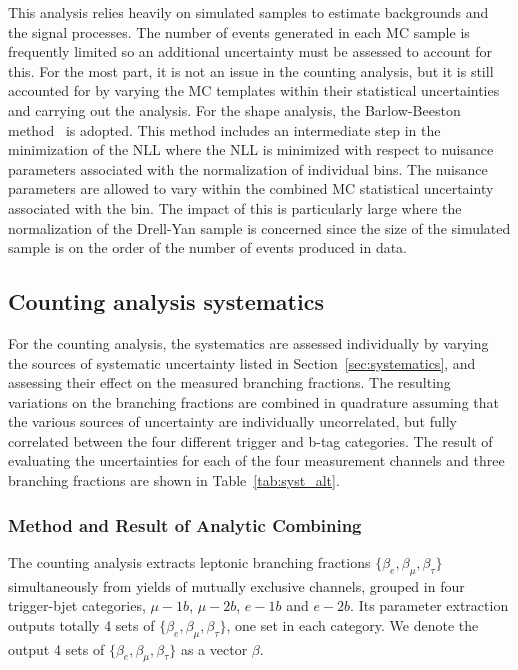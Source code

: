 This analysis relies heavily on simulated samples to estimate
backgrounds and the signal processes.  The number of events generated in
each MC sample is frequently limited so an additional uncertainty must
be assessed to account for this.  For the most part, it is not an issue
in the counting analysis, but it is still accounted for by varying the
MC templates within their statistical uncertainties and carrying out the
analysis.  For the shape analysis, the Barlow-Beeston
method~\cite{Amsler:2008zzb} is adopted.  This method includes an
intermediate step in the minimization of the NLL where the NLL is
minimized with respect to nuisance parameters associated with the
normalization of individual bins.  The nuisance parameters are allowed
to vary within the combined MC statistical uncertainty associated with the
bin.  The impact of this is particularly large where the normalization
of the Drell-Yan sample is concerned since the size of the simulated
sample is on the order of the number of events produced in data.




\subsection{Counting analysis systematics}

For the counting analysis, the systematics are assessed individually by
varying the sources of systematic uncertainty listed in
Section~\ref{sec:systematics}, and assessing their effect on the
measured branching fractions.  The resulting variations on the branching
fractions are combined in quadrature assuming that the various sources
of uncertainty are individually uncorrelated, but fully correlated
between the four different trigger and b-tag categories.  The result of
evaluating the uncertainties for each of the four measurement channels
and three branching fractions are shown in Table~\ref{tab:syst_alt}.

\subsubsection{Method and Result of Analytic Combining}

The counting analysis extracts leptonic branching fractions
$\{\beta_e, \beta_\mu, \beta_\tau\}$ simultaneously from yields of mutually exclusive channels, 
grouped in four trigger-bjet categories, $\mu-1b$,  $\mu-2b$,  $e-1b$ and $e-2b$.
Its parameter extraction outputs totally 4 sets of $\{\beta_e, \beta_\mu, \beta_\tau\}$,
one set in each category. We denote the output 4 sets of $\{\beta_e, \beta_\mu, \beta_\tau\}$
as a vector $\beta$.

